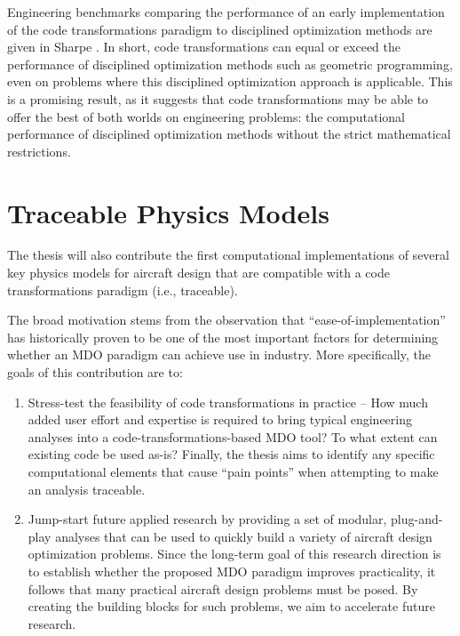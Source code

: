 \documentclass[12pt,vi,oneside,table]{report}
\begin{document}
    Engineering benchmarks comparing the performance of an early implementation of the code transformations paradigm to disciplined optimization methods are given in Sharpe \cite{sharpe_aerosandbox_2021}. In short, code transformations can equal or exceed the performance of disciplined optimization methods such as geometric programming, even on problems where this disciplined optimization approach is applicable. This is a promising result, as it suggests that code transformations may be able to offer the best of both worlds on engineering problems: the computational performance of disciplined optimization methods without the strict mathematical restrictions.

    \section{Traceable Physics Models}
    \label{sec:physics_models}

    The thesis will also contribute the first computational implementations of several key physics models for aircraft design that are compatible with a code transformations paradigm (i.e., traceable).

    The broad motivation stems from the observation that ``ease-of-implementation'' has historically proven to be one of the most important factors for determining whether an MDO paradigm can achieve use in industry. More specifically, the goals of this contribution are to:

    \begin{enumerate}
        \item Stress-test the feasibility of code transformations in practice -- How much added user effort and expertise is required to bring typical engineering analyses into a code-transformations-based MDO tool? To what extent can existing code be used as-is? Finally, the thesis aims to identify any specific computational elements that cause ``pain points'' when attempting to make an analysis traceable.
        \item Jump-start future applied research by providing a set of modular, plug-and-play analyses that can be used to quickly build a variety of aircraft design optimization problems. Since the long-term goal of this research direction is to establish whether the proposed MDO paradigm improves practicality, it follows that many practical aircraft design problems must be posed. By creating the building blocks for such problems, we aim to accelerate future research.
    \end{enumerate}
\end{document}
